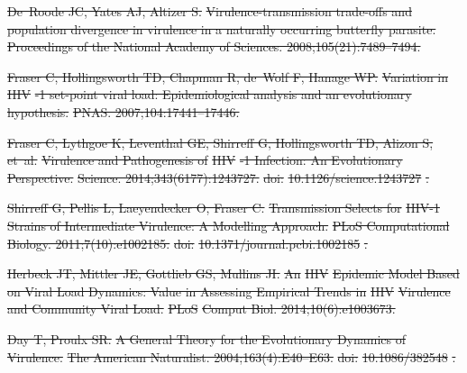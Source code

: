 \documentclass[10pt,letterpaper]{article}
\providecommand{\DIFdeltex}[1]{{\protect\color{red}\sout{#1}}}                      %
\providecommand{\DIFdel}[1]{\texorpdfstring{\DIFdeltex{#1}}{}} %
\begin{document}
\DIFdel{De~Roode JC, Yates AJ, Altizer S.
}%
\DIFdel{Virulence-transmission trade-offs and population divergence in
  virulence in a naturally occurring butterfly parasite.
}%
\DIFdel{Proceedings of the National Academy of Sciences. 2008;105(21):7489--7494.
}%

\DIFdel{Fraser C, Hollingsworth TD, Chapman R, de~Wolf F, Hanage WP.
}%
\DIFdel{Variation in }%
\DIFdel{HIV}%
\DIFdel{-1 set-point viral load: Epidemiological analysis
  and an evolutionary hypothesis.
}%
\DIFdel{PNAS. 2007;104:17441--17446.
}%

\DIFdel{Fraser C, Lythgoe K, Leventhal GE, Shirreff G, Hollingsworth TD, Alizon S,
  et~al.
}%
\DIFdel{Virulence and Pathogenesis of }%
\DIFdel{HIV}%
\DIFdel{-1 Infection: An Evolutionary
  Perspective.
}%
\DIFdel{Science. 2014;343(6177):1243727.
}%
\DIFdel{doi:}%
\DIFdel{10.1126/science.1243727}%
\DIFdel{.
}%

\DIFdel{Shirreff G, Pellis L, Laeyendecker O, Fraser C.
}%
\DIFdel{Transmission Selects for }%
\DIFdel{HIV-1}%
\DIFdel{Strains of Intermediate Virulence: A
  Modelling Approach. }%
\DIFdel{PLoS Computational Biology. 2011;7(10):e1002185.
}%
\DIFdel{doi:}%
\DIFdel{10.1371/journal.pcbi.1002185}%
\DIFdel{.
}%

\DIFdel{Herbeck JT, Mittler JE, Gottlieb GS, Mullins JI.
}%
\DIFdel{An }%
\DIFdel{HIV}%
\DIFdel{Epidemic Model Based on Viral Load Dynamics: Value in
  Assessing Empirical Trends in }%
\DIFdel{HIV}%
\DIFdel{Virulence and Community Viral Load. }%
\DIFdel{PLoS}%
\DIFdel{Comput Biol. 2014;10(6):e1003673.
}%

\DIFdel{Day T, Proulx SR. }%
\DIFdel{A General Theory for the Evolutionary Dynamics of Virulence.
}%
\DIFdel{The American Naturalist. 2004;163(4):E40--E63.
}%
\DIFdel{doi:}%
\DIFdel{10.1086/382548}%
\DIFdel{.
}%
\end{document}
